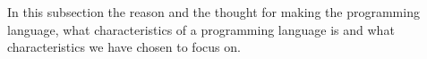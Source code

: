 In this subsection the reason and the thought for making the programming language, what characteristics of a programming language is and what characteristics we have chosen to focus on.